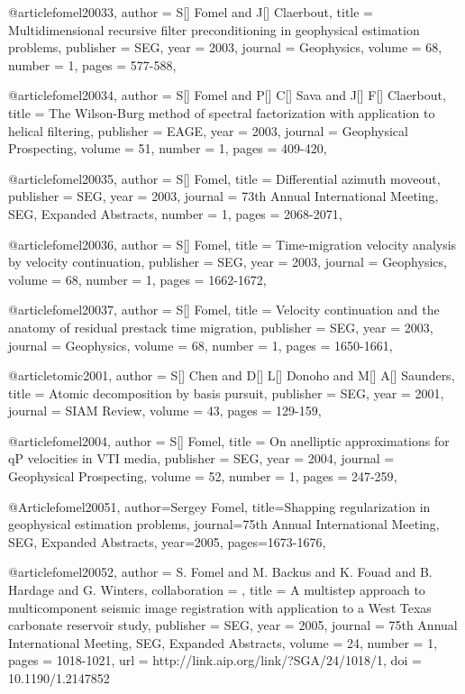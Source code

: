 @article{fomel20033,
  author =	 {S[] Fomel and J[] Claerbout},
  title =	 {Multidimensional recursive filter preconditioning in geophysical estimation problems},
  publisher =	 {SEG},
  year =	 2003,
  journal =	 {Geophysics},
  volume =	 68,
  number =	 1,
  pages =	 {577-588},
}

@article{fomel20034,
  author =	 {S[] Fomel and P[] C[] Sava and J[] F[] Claerbout},
  title =	 {The Wilson-Burg method of spectral factorization with application to helical filtering},
  publisher =	 {EAGE},
  year =	 2003,
  journal =	 {Geophysical Prospecting},
  volume =	 51,
  number =	 1,
  pages =	 {409-420},
}

@article{fomel20035,
  author =	 {S[] Fomel},
  title =	 {Differential azimuth moveout},
  publisher =	 {SEG},
  year =	 2003,
  journal =	 {73th Annual International Meeting, SEG, Expanded Abstracts},
  number =	 1,
  pages =	 {2068-2071},
}

@article{fomel20036,
  author =	 {S[] Fomel},
  title =	 {Time-migration velocity analysis by velocity continuation},
  publisher =	 {SEG},
  year =	 2003,
  journal =	 {Geophysics},
  volume =	 68,
  number =	 1,
  pages =	 {1662-1672},
}

@article{fomel20037,
  author =	 {S[] Fomel},
  title =	 {Velocity continuation and the anatomy of residual prestack time migration},
  publisher =	 {SEG},
  year =	 2003,
  journal =	 {Geophysics},
  volume =	 68,
  number =	 1,
  pages =	 {1650-1661},
}

@article{tomic2001,
  author =	 {S[] Chen and D[] L[] Donoho and M[] A[] Saunders},
  title =	 {Atomic decomposition by basis pursuit},
  publisher =	 {SEG},
  year =	 2001,
  journal =	 {SIAM Review},
  volume =	 43,
  pages =	 {129-159},
}

@article{fomel2004,
  author =	 {S[] Fomel},
  title =	 {On anelliptic approximations for qP velocities in VTI media},
  publisher =	 {SEG},
  year =	 2004,
  journal =	 {Geophysical Prospecting},
  volume =	 52,
  number =	 1,
  pages =	 {247-259},
}

@Article{fomel20051,
  author={Sergey Fomel},
  title={Shapping regularization in geophysical estimation problems},
  journal={75th Annual International Meeting, SEG, Expanded Abstracts},
  year=2005,
  pages={1673-1676},
}

@article{fomel20052,
author = {S. Fomel and M. Backus and K. Fouad and B. Hardage and G. Winters},
collaboration = {},
title = {A multistep approach to multicomponent seismic image
                  registration with application to a {W}est {T}exas
                  carbonate reservoir study},
publisher = {SEG},
year = {2005},
journal = {75th Annual International Meeting, SEG, Expanded Abstracts},
volume = {24},
number = {1},
pages = {1018-1021},
url = {http://link.aip.org/link/?SGA/24/1018/1},
doi = {10.1190/1.2147852}
}


